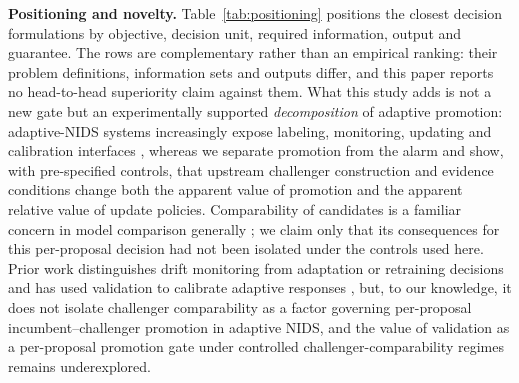 \documentclass[a4paper,fleqn]{cas-sc}
\begin{document}
\textbf{Positioning and novelty.} Table~\ref{tab:positioning} positions the closest decision formulations by objective, decision unit, required information, output and guarantee. The rows are complementary rather than an empirical ranking: their problem definitions, information sets and outputs differ, and this paper reports no head-to-head superiority claim against them. What this study adds is not a new gate but an experimentally supported \emph{decomposition} of adaptive promotion: adaptive-NIDS systems increasingly expose labeling, monitoring, updating and calibration interfaces \cite{zhang2024caravan,amalapuram2024spider,pederzoli2025noctowl,yuan2026adawu}, whereas we separate promotion from the alarm and show, with pre-specified controls, that upstream challenger construction and evidence conditions change both the apparent value of promotion and the apparent relative value of update policies. Comparability of candidates is a familiar concern in model comparison generally \cite{sawade2012active,karimi2021online}; we claim only that its consequences for this per-proposal decision had not been isolated under the controls used here. Prior work distinguishes drift monitoring from adaptation or retraining decisions \cite{bayram2022degradation,regol2025retrain,bakirov2021automated} and has used validation to calibrate adaptive responses \cite{yuan2026adawu}, but, to our knowledge, it does not isolate challenger comparability as a factor governing per-proposal incumbent--challenger promotion in adaptive NIDS, and the value of validation as a per-proposal promotion gate under controlled challenger-comparability regimes remains underexplored.
\end{document}
